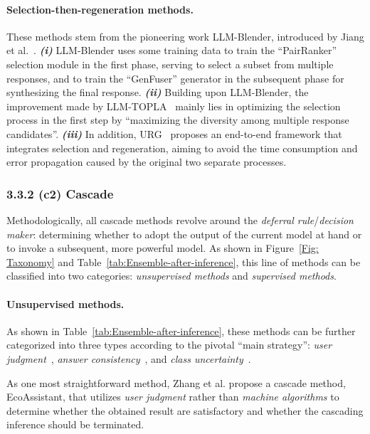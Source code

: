 \documentclass{article}
\begin{document}
\paragraph{Selection-then-regeneration methods.}
These methods stem from the pioneering work LLM-Blender, introduced by Jiang et al.~.
\textbf{\textit{(i)}}
LLM-Blender uses some training data to train the ``PairRanker'' selection module in the first phase, serving to select a subset from multiple responses,  and to train the ``GenFuser'' generator in the subsequent phase for synthesizing the final response.
\textbf{\textit{(ii)}}
Building upon LLM-Blender, the improvement made by LLM-TOPLA~\cite{tekin2024llm} mainly lies in optimizing the selection process in the first step by ``maximizing the diversity among multiple response candidates''.  
\textbf{\textit{(iii)}}
In addition, URG~\cite{lv2024urg} proposes an end-to-end framework that integrates selection and regeneration, aiming to avoid the time consumption and error propagation caused by the original two separate processes.






\subsubsection{3.3.2 (c2) Cascade}
Methodologically, all cascade methods revolve around the \textit{deferral rule}/\textit{decision maker}: determining whether to adopt the output of the current model at hand or to invoke a subsequent, more powerful model.
As shown in Figure~\ref{Fig: Taxonomy} and Table~\ref{tab:Ensemble-after-inference}, this line of methods can be classified into two categories: \textit{unsupervised methods} and  \textit{supervised methods}.




\paragraph{Unsupervised methods.}
As shown in Table~\ref{tab:Ensemble-after-inference}, these methods can be further categorized into three types according to the pivotal ``main strategy'': \textit{user judgment}~\cite{zhang2023ecoassistant}, \textit{answer consistency}~\cite{yuelarge,ramirez2023cache}, and \textit{class uncertainty}~\cite{varshney2022model,ramirez2023cache,dekoninck2024unified}.



As one most straightforward method, Zhang et al.   propose a cascade method, EcoAssistant, that utilizes \textit{user judgment} rather than \textit{machine algorithms} to determine whether the obtained result are satisfactory and whether the cascading inference should be terminated.
\end{document}
